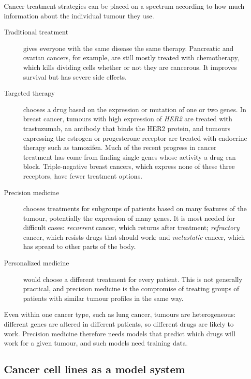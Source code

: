 Cancer treatment strategies can be placed on a spectrum according to how much information about the individual tumour they use.
\begin{description}
  \item[Traditional treatment] gives everyone with the same disease the same therapy. Pancreatic and ovarian cancers, for example, are still mostly treated with chemotherapy, which kills dividing cells whether or not they are cancerous. It improves survival but has severe side effects.
  \item[Targeted therapy] chooses a drug based on the expression or mutation of one or two genes. In breast cancer, tumours with high expression of \textit{HER2} are treated with trastuzumab, an antibody that binds the HER2 protein, and tumours expressing the estrogen or progesterone receptor are treated with endocrine therapy such as tamoxifen. Much of the recent progress in cancer treatment has come from finding single genes whose activity a drug can block. Triple-negative breast cancers, which express none of these three receptors, have fewer treatment options.
  \item[Precision medicine] chooses treatments for subgroups of patients based on many features of the tumour, potentially the expression of many genes. It is most needed for difficult cases: \emph{recurrent} cancer, which returns after treatment; \emph{refractory} cancer, which resists drugs that should work; and \emph{metastatic} cancer, which has spread to other parts of the body.
  \item[Personalized medicine] would choose a different treatment for every patient. This is not generally practical, and precision medicine is the compromise of treating groups of patients with similar tumour profiles in the same way.
\end{description}
Even within one cancer type, such as lung cancer, tumours are heterogeneous: different genes are altered in different patients, so different drugs are likely to work. Precision medicine therefore needs models that predict which drugs will work for a given tumour, and such models need training data.

\subsection{Cancer cell lines as a model system}

